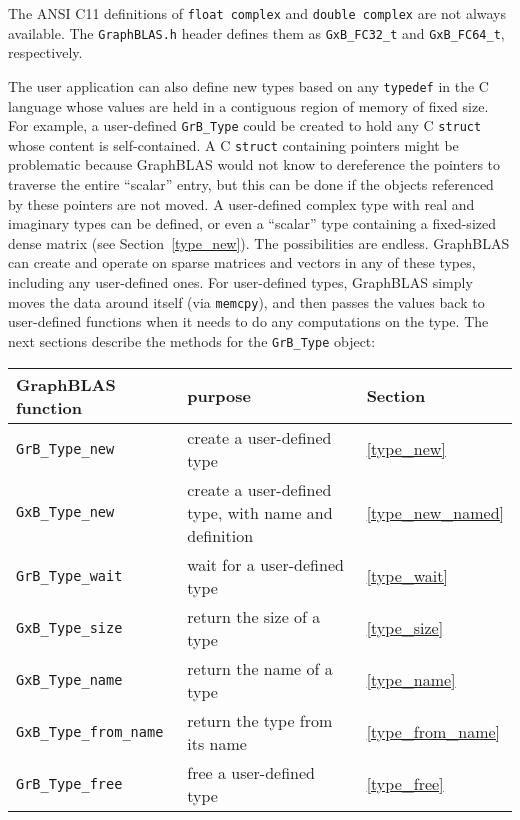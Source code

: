 \documentclass[12pt]{article}
\begin{document}
The ANSI C11 definitions of \verb'float complex' and \verb'double complex'
are not always available.  The \verb'GraphBLAS.h' header defines them as
\verb'GxB_FC32_t' and \verb'GxB_FC64_t', respectively.

The user application can also define new types based on any \verb'typedef' in
the C language whose values are held in a contiguous region of memory of fixed
size.  For example, a user-defined \verb'GrB_Type' could be created to hold any
C \verb'struct' whose content is self-contained.  A C \verb'struct' containing
pointers might be problematic because GraphBLAS would not know to dereference
the pointers to traverse the entire ``scalar'' entry, but this can be done if
the objects referenced by these pointers are not moved.  A user-defined complex
type with real and imaginary types can be defined, or even a ``scalar'' type
containing a fixed-sized dense matrix (see Section~\ref{type_new}).  The
possibilities are endless.  GraphBLAS can create and operate on sparse matrices
and vectors in any of these types, including any user-defined ones.  For
user-defined types, GraphBLAS simply moves the data around itself (via
\verb'memcpy'), and then passes the values back to user-defined functions when
it needs to do any computations on the type.  The next sections describe the
methods for the \verb'GrB_Type' object:

\vspace{0.2in}
{\footnotesize
\begin{tabular}{lll}
\hline
GraphBLAS function       & purpose                          & Section \\
\hline
\verb'GrB_Type_new'      & create a user-defined type       & \ref{type_new} \\
\verb'GxB_Type_new'      & create a user-defined type,
                            with name and definition        & \ref{type_new_named} \\
\verb'GrB_Type_wait'     & wait for a user-defined type     & \ref{type_wait} \\
\verb'GxB_Type_size'     & return the size of a type        & \ref{type_size} \\
\verb'GxB_Type_name'     & return the name of a type        & \ref{type_name} \\
\verb'GxB_Type_from_name'& return the type from its name    & \ref{type_from_name} \\
\verb'GrB_Type_free'     & free a user-defined type         & \ref{type_free} \\
\hline
\end{tabular}
}
\end{document}
